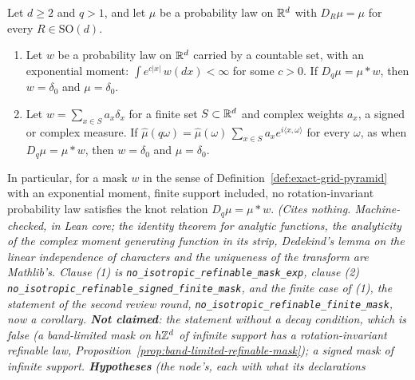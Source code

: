 \begin{proposition}
\label{prop:no-isotropic-refinable-finite-mask}
\leanok
{}
Let $d \ge 2$ and $q > 1$, and let $\mu$ be a probability law on $\mathbb{R}^d$ with $D_R\mu = \mu$ for
every $R \in \mathrm{SO}(d)$.
\begin{enumerate}
\item Let $w$ be a probability law on $\mathbb{R}^d$ carried by a countable set, with an exponential
moment: $\int e^{c|x|}\,w(dx) < \infty$ for some $c > 0$. If $D_q\mu = \mu * w$, then
$w = \delta_0$ and $\mu = \delta_0$.
\item Let $w = \sum_{x \in S}a_x\delta_x$ for a finite set $S \subset \mathbb{R}^d$ and complex weights
$a_x$, a signed or complex measure. If $\widehat\mu(q\omega) = \widehat\mu(\omega)\,
\sum_{x \in S}a_xe^{i\langle x, \omega\rangle}$ for every $\omega$, as when $D_q\mu = \mu * w$,
then $w = \delta_0$ and $\mu = \delta_0$.
\end{enumerate}
In particular, for a mask $w$ in the sense of Definition~\ref{def:exact-grid-pyramid} with an
exponential moment, finite support included, no rotation-invariant probability law satisfies the knot
relation $D_q\mu = \mu * w$.
\statusT\quad\emph{(Cites nothing. Machine-checked, in Lean core; the identity theorem for analytic
functions, the analyticity of the complex moment generating function in its strip, Dedekind's
lemma on the linear independence of characters and the uniqueness of the transform are Mathlib's.
Clause (1) is \texttt{no\_isotropic\_refinable\_mask\_exp}, clause (2)
\texttt{no\_isotropic\_refinable\_signed\_finite\_mask}, and the finite case of (1), the statement of
the second review round, \texttt{no\_isotropic\_refinable\_finite\_mask}, now a corollary.
\textbf{Not claimed}: the statement without a decay condition, which is false (a band-limited mask
on $h\mathbb{Z}^d$ of infinite support has a rotation-invariant refinable law,
Proposition~\ref{prop:band-limited-refinable-mask}); a signed
mask of infinite support. \textbf{Hypotheses} (the node's, each with what its declarations
}
\end{proposition}
